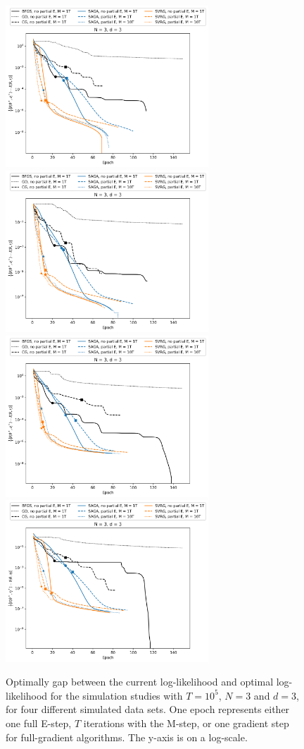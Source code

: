 \documentclass{article}
\begin{document}
\begin{figure}
    \centering
    \includegraphics[width=3in]{../plt/log-like_v_epoch_T-100000-K-3-1-d-3-001.png}
    \includegraphics[width=3in]{../plt/log-like_v_epoch_T-100000-K-3-1-d-3-002.png}
    \\
    \includegraphics[width=3in]{../plt/log-like_v_epoch_T-100000-K-3-1-d-3-003.png}
    \includegraphics[width=3in]{../plt/log-like_v_epoch_T-100000-K-3-1-d-3-004.png}   
    \caption{Optimally gap between the current log-likelihood and optimal log-likelihood for the simulation studies with $T=10^{5}$, $N=3$ and $d=3$, for four different simulated data sets. One epoch represents either one full E-step, $T$ iterations with the M-step, or one gradient step for full-gradient algorithms. The y-axis is on a log-scale.}
\end{figure}
\end{document}
